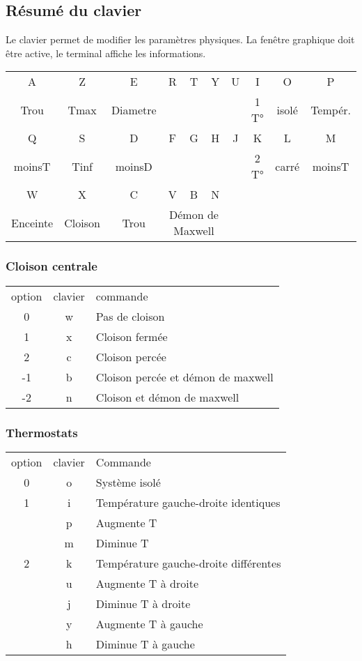 \subsection{Résumé du clavier}
%
Le clavier permet de modifier les paramètres physiques. La fenêtre graphique doit être active, le terminal affiche les informations.
\begin{center}
\begin{tabular}{cccccccccc}
\sf A &\sf Z &\sf E &\sf R &\sf T &\sf Y &\sf U &\sf I &\sf O &\sf P \\
Trou & Tmax & Diametre &  &  &  &  & 1 T° & isolé & Tempér. \\
\sf Q &\sf S &\sf D &\sf F &\sf G &\sf H &\sf J &\sf K &\sf L &\sf M \\
moinsT & Tinf & moinsD &  &  &  &  & 2 T° & carré & moinsT \\
\sf W &\sf X &\sf C &\sf V &\sf B &\sf N &  &  &  & \\
Enceinte & Cloison & Trou & \multicolumn{3}{c}{Démon de Maxwell} &  &  &  & \\
\end{tabular}
\end{center}
\subsubsection{Cloison centrale}
%
\begin{center}
\begin{tabular}{ccl}
option & clavier & commande \\
0 & {\sf w} & Pas de cloison\\
1 & {\sf x} & Cloison fermée\\
2 & {\sf c} & Cloison percée\\
-1 & {\sf b} & Cloison percée et démon de maxwell \\
-2 & {\sf n} & Cloison et démon de maxwell \\
\end{tabular}
\end{center}
%
\subsubsection{Thermostats}
%
\begin{center}
\begin{tabular}{ccl}
option & clavier & Commande \\
0 & {\sf o} & Système isolé\\
1 & {\sf i} & Température gauche-droite identiques\\
 & {\sf p} & Augmente T\\
 & {\sf m} & Diminue T\\
2 & {\sf k} & Température gauche-droite différentes\\
 & {\sf u} & Augmente T à droite\\
 & {\sf j} & Diminue T à droite\\
 & {\sf y} & Augmente T à gauche\\
 & {\sf h} & Diminue T à gauche\\
\end{tabular}
\end{center}
%
